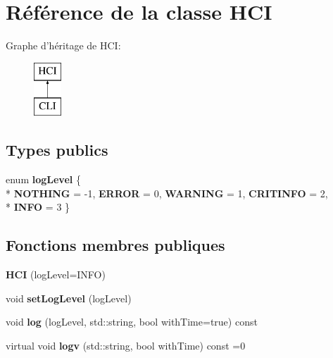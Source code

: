 \hypertarget{classHCI}{\section{Référence de la classe H\-C\-I}
\label{classHCI}
}
Graphe d'héritage de H\-C\-I\-:\begin{figure}[H]
\begin{center}
\leavevmode
\includegraphics[height=2.000000cm]{classHCI}
\end{center}
\end{figure}
\subsection*{Types publics}
\begin{DoxyCompactItemize}
\item 
enum {\bfseries log\-Level} \{ \\*
{\bfseries N\-O\-T\-H\-I\-N\-G} = -\/1, 
{\bfseries E\-R\-R\-O\-R} = 0, 
{\bfseries W\-A\-R\-N\-I\-N\-G} = 1, 
{\bfseries C\-R\-I\-T\-I\-N\-F\-O} = 2, 
\\*
{\bfseries I\-N\-F\-O} = 3
 \}
\end{DoxyCompactItemize}
\subsection*{Fonctions membres publiques}
\begin{DoxyCompactItemize}
\item 
\hypertarget{classHCI_a3cac51013396bb8a130298a04b966856}{{\bfseries H\-C\-I} (log\-Level=I\-N\-F\-O)}\label{classHCI_a3cac51013396bb8a130298a04b966856}

\item 
\hypertarget{classHCI_ab30b1bd8e7b5ddb8764128e9da1b3062}{void {\bfseries set\-Log\-Level} (log\-Level)}\label{classHCI_ab30b1bd8e7b5ddb8764128e9da1b3062}

\item 
\hypertarget{classHCI_a3ba0116597c8a43a7ceac9639150e6c1}{void {\bfseries log} (log\-Level, std\-::string, bool with\-Time=true) const }\label{classHCI_a3ba0116597c8a43a7ceac9639150e6c1}

\item 
\hypertarget{classHCI_a63e5f2061611136d467cda53e4636713}{virtual void {\bfseries logv} (std\-::string, bool with\-Time) const =0}\label{classHCI_a63e5f2061611136d467cda53e4636713}

\end{DoxyCompactItemize}
